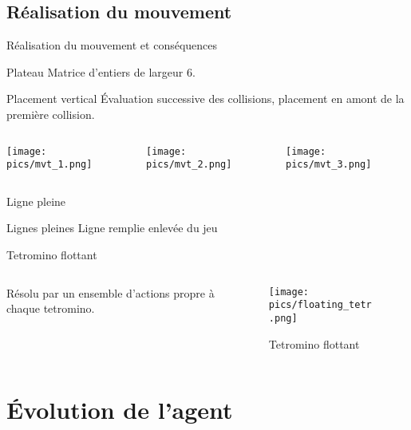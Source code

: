 \documentclass[tikz, footheight=2em]{beamer}
\begin{document}
\subsection{Réalisation du mouvement}
\begin{frame}[c]{Réalisation du mouvement et conséquences}
  \begin{block}{Plateau}
    Matrice d'entiers de largeur 6.
  \end{block}
  \begin{block}{Placement vertical}
    Évaluation successive des collisions, placement en amont de la première
    collision.
    \begin{columns}[t]
      \begin{column}{0.33\linewidth}
        \texttt{[image: pics/mvt\_1.png]}
      \end{column}
      \begin{column}{0.34\linewidth}
        \texttt{[image: pics/mvt\_2.png]}
      \end{column}
      \begin{column}{0.33\linewidth}
        \texttt{[image: pics/mvt\_3.png]}
      \end{column}
    \end{columns}
  \end{block}
\end{frame}
\begin{frame}[c]{Ligne pleine}
  \begin{block}{Lignes pleines}
    Ligne remplie enlevée du jeu
  \end{block}
  \begin{alertblock}{Tetromino flottant}
    \begin{columns}[t]
      \begin{column}{0.5\linewidth}
        Résolu par un ensemble d'actions propre à chaque tetromino.
      \end{column}
      \begin{column}{0.5\linewidth}
          \begin{figure}[H]
            \centering
            \texttt{[image: pics/floating\_tetr.png]}
            \caption{Tetromino flottant}
          \end{figure}
      \end{column}
    \end{columns}
  \end{alertblock}
\end{frame}

\section{Évolution de l'agent}
\end{document}

